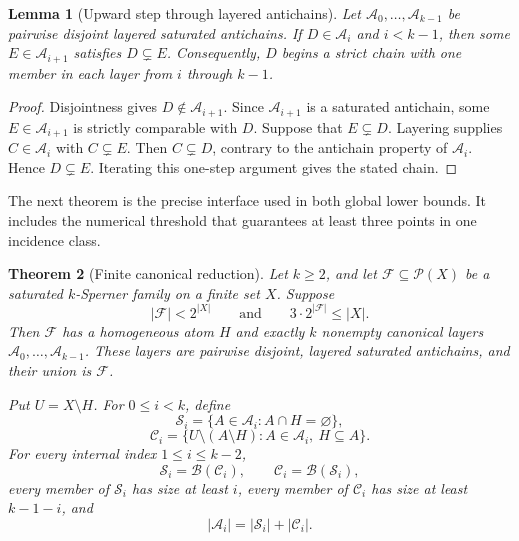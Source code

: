 \documentclass[11pt]{article}
\newtheorem{theorem}{Theorem}[section]
\newtheorem{lemma}[theorem]{Lemma}
\theoremstyle{definition}
\theoremstyle{remark}
\newcommand{\powerset}{\mathcal{P}}
\newcommand{\family}{\mathcal{F}}
\newcommand{\blocker}{\mathcal{B}}
\begin{document}
\begin{lemma}[Upward step through layered antichains]
\label{lem:upward-step}
Let $\mathcal A_0,\ldots,\mathcal A_{k-1}$ be pairwise disjoint layered
saturated antichains.  If $D\in\mathcal A_i$ and $i<k-1$, then some
$E\in\mathcal A_{i+1}$ satisfies $D\subsetneq E$.  Consequently, $D$ begins
a strict chain with one member in each layer from $i$ through $k-1$.
\end{lemma}

\begin{proof}
Disjointness gives $D\notin\mathcal A_{i+1}$.  Since
$\mathcal A_{i+1}$ is a saturated antichain, some
$E\in\mathcal A_{i+1}$ is strictly comparable with $D$.  Suppose that
$E\subsetneq D$.  Layering supplies $C\in\mathcal A_i$ with
$C\subsetneq E$.  Then $C\subsetneq D$, contrary to the antichain property
of $\mathcal A_i$.  Hence $D\subsetneq E$.  Iterating this one-step argument
gives the stated chain.
\end{proof}

The next theorem is the precise interface used in both global lower bounds.
It includes the numerical threshold that guarantees at least three points in
one incidence class.

\begin{theorem}[Finite canonical reduction]
\label{thm:canonical-reduction}
Let $k\geq2$, and let $\family\subseteq\powerset(X)$ be a saturated
$k$-Sperner family on a finite set $X$.  Suppose
\[
  |\family|<2^{|X|}
  \qquad\text{and}\qquad
  3\cdot2^{|\family|}\leq |X|.            \tag{CR1}
\]
Then $\family$ has a homogeneous atom $H$ and exactly $k$ nonempty canonical
layers $\mathcal A_0,\ldots,\mathcal A_{k-1}$.  These layers are pairwise
disjoint, layered saturated antichains, and their union is $\family$.

Put $U=X\setminus H$.  For $0\leq i<k$, define
\[
  \mathcal S_i=\{A\in\mathcal A_i:A\cap H=\varnothing\},
\]
\[
  \mathcal C_i=
  \{U\setminus(A\setminus H):A\in\mathcal A_i,\ H\subseteq A\}.
\]
For every internal index $1\leq i\leq k-2$,
\[
  \mathcal S_i=\blocker(\mathcal C_i),\qquad
  \mathcal C_i=\blocker(\mathcal S_i),     \tag{CR2}
\]
every member of $\mathcal S_i$ has size at least $i$, every member of
$\mathcal C_i$ has size at least $k-1-i$, and
\[
  |\mathcal A_i|=|\mathcal S_i|+|\mathcal C_i|.             \tag{CR3}
\]
\end{theorem}
\end{document}
